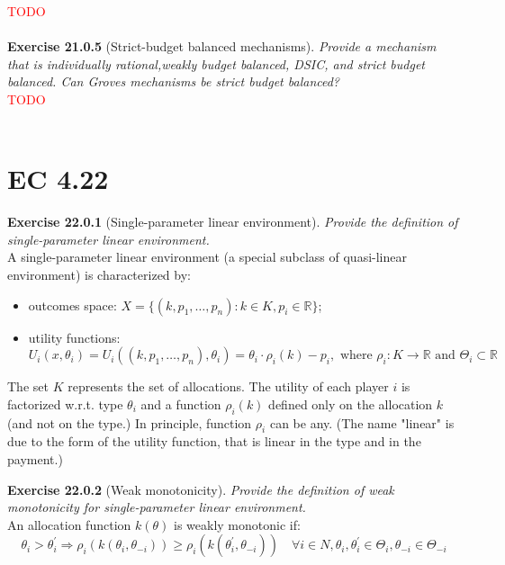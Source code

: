 \textcolor{red}{TODO}\\\\

\textbf{Exercise 21.0.5} (Strict-budget balanced mechanisms). \textit{Provide a mechanism that is individually rational,weakly budget balanced, DSIC, and strict budget balanced. Can Groves mechanisms be strict budget balanced?}\\

\textcolor{red}{TODO}\\\\

\section{EC 4.22}

\textbf{Exercise 22.0.1} (Single-parameter linear environment). \textit{Provide the definition of single-parameter linear environment.}\\

A single-parameter linear environment (a special subclass of quasi-linear environment) is characterized by:
\begin{itemize}
\item outcomes space: $X = \{ (k, p_1, \ldots, p_n): k \in K, p_i \in \mathbb{R}\}$;
\item utility functions: $U_{i}\left(x, \theta_{i}\right)=U_{i}\left(\left(k, p_{1}, \ldots, p_{n}\right), \theta_{i}\right)=\theta_{i} \cdot \rho_{i}(k)-p_{i}, \text { where } \rho_{i}: K \rightarrow \mathbb{R} \text { and } \Theta_{i} \subset \mathbb{R}$
\end{itemize}
The set $K$ represents the set of allocations. The utility of each player $i$ is factorized w.r.t. type $\theta_i$ and a function $\rho_i(k)$ defined only on the allocation $k$ (and not on the type.) In principle, function $\rho_i$ can be any. (The name "linear" is due to the form of the utility function, that is linear in the type and in the payment.)

\textbf{Exercise 22.0.2} (Weak monotonicity). \textit{Provide the definition of weak monotonicity for single-parameter linear environment.}\\

An allocation function $k(\theta)$ is weakly monotonic if:
$$
\theta_{i}>\theta_{i}^{\prime} \Rightarrow \rho_{i}\left(k\left(\theta_{i}, \theta_{-i}\right)\right) \geqslant \rho_{i}\left(k\left(\theta_{i}^{\prime}, \theta_{-i}\right)\right) \quad \forall i \in N, \theta_{i}, \theta_{i}^{\prime} \in \Theta_{i}, \theta_{-i} \in \Theta_{-i}
$$

